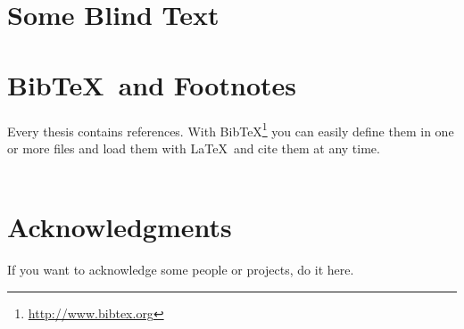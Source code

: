 \documentclass[bachelorthesis, deutsch]{syssec-thesis} %
\begin{document}
\chapter{Some Blind Text}

\Blindtext



\chapter{Bib\TeX\ and Footnotes}

Every thesis contains references. With Bib\TeX\footnote{\url{http://www.bibtex.org}} you can easily define them in one or more files and load them with \LaTeX\ and cite them at any time.\\\\
\cite{exampleArticle}



\chapter*{Acknowledgments}

If you want to acknowledge some people or projects, do it here.



\cleardoublepage
\affidavit


\printbibliography[heading=bibintoc]
\end{document}
